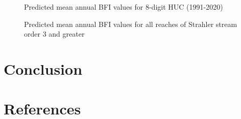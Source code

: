 \documentclass[
]{agujournal2019}
\begin{document}
\begin{figure}


\caption{\label{fig-bfi-huc}Predicted mean annual BFI values for 8-digit
HUC (1991-2020)}

\end{figure}%

\begin{figure}


\caption{\label{fig-bfi-streams}Predicted mean annual BFI values for all
reaches of Strahler stream order 3 and greater}

\end{figure}%

\section{Conclusion}\label{sec-conclusion}

\section*{References}\label{references}
\end{document}
